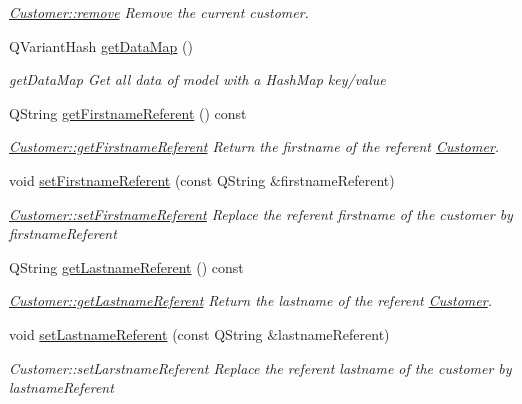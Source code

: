 \begin{DoxyCompactItemize}
\begin{DoxyCompactList}\small\item\em \hyperlink{classModels_1_1Customer_a0f5dba0d90af0adf5d0aca26195d21b1}{Customer\-::remove} Remove the current customer. \end{DoxyCompactList}\item 
Q\-Variant\-Hash \hyperlink{classModels_1_1Customer_ae72b05319056dc482f3f525ef40b8d40}{get\-Data\-Map} ()
\begin{DoxyCompactList}\small\item\em get\-Data\-Map Get all data of model with a Hash\-Map key/value \end{DoxyCompactList}\item 
Q\-String \hyperlink{classModels_1_1Customer_a30934fb39c552863e588c40d01725a18}{get\-Firstname\-Referent} () const 
\begin{DoxyCompactList}\small\item\em \hyperlink{classModels_1_1Customer_a30934fb39c552863e588c40d01725a18}{Customer\-::get\-Firstname\-Referent} Return the firstname of the referent \hyperlink{classModels_1_1Customer}{Customer}. \end{DoxyCompactList}\item 
void \hyperlink{classModels_1_1Customer_a40cbc71c349a0d022b21543bbc7a120a}{set\-Firstname\-Referent} (const Q\-String \&firstname\-Referent)
\begin{DoxyCompactList}\small\item\em \hyperlink{classModels_1_1Customer_a40cbc71c349a0d022b21543bbc7a120a}{Customer\-::set\-Firstname\-Referent} Replace the referent firstname of the customer by {\itshape firstname\-Referent} \end{DoxyCompactList}\item 
Q\-String \hyperlink{classModels_1_1Customer_a73b93f9ad0718980bbfa2b283b3285ba}{get\-Lastname\-Referent} () const 
\begin{DoxyCompactList}\small\item\em \hyperlink{classModels_1_1Customer_a73b93f9ad0718980bbfa2b283b3285ba}{Customer\-::get\-Lastname\-Referent} Return the lastname of the referent \hyperlink{classModels_1_1Customer}{Customer}. \end{DoxyCompactList}\item 
void \hyperlink{classModels_1_1Customer_a64ff31bbe0c7aba0b9976d8d253b7b33}{set\-Lastname\-Referent} (const Q\-String \&lastname\-Referent)
\begin{DoxyCompactList}\small\item\em Customer\-::set\-Larstname\-Referent Replace the referent lastname of the customer by {\itshape lastname\-Referent} \end{DoxyCompactList}\item 

\end{DoxyCompactItemize}
